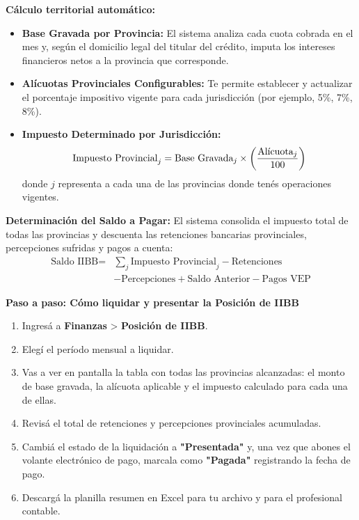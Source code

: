 \documentclass[12pt,a4paper]{article}
\renewcommand{\_}{\textunderscore\allowbreak}
\begin{document}
\textbf{Cálculo territorial automático:}
\begin{itemize}
    \item \textbf{Base Gravada por Provincia:} El sistema analiza cada cuota cobrada en el mes y, según el domicilio legal del titular del crédito, imputa los intereses financieros netos a la provincia que corresponde.
    \item \textbf{Alícuotas Provinciales Configurables:} Te permite establecer y actualizar el porcentaje impositivo vigente para cada jurisdicción (por ejemplo, 5\%, 7\%, 8\%).
    \item \textbf{Impuesto Determinado por Jurisdicción:}
          \begin{equation}
              \text{Impuesto Provincial}_{j} = \text{Base Gravada}_{j} \times \left(\frac{\text{Al\'{\i}cuota}_{j}}{100}\right)
          \end{equation}
          donde $j$ representa a cada una de las provincias donde tenés operaciones vigentes.
\end{itemize}

\textbf{Determinación del Saldo a Pagar:}
El sistema consolida el impuesto total de todas las provincias y descuenta las retenciones bancarias provinciales, percepciones sufridas y pagos a cuenta:
\begin{equation}
    \begin{aligned}
        \text{Saldo IIBB} ={} & \sum_{j} \text{Impuesto Provincial}_{j} - \text{Retenciones} \\
        & - \text{Percepciones} + \text{Saldo Anterior} - \text{Pagos VEP}
    \end{aligned}
\end{equation}

\textbf{Paso a paso: Cómo liquidar y presentar la Posición de IIBB}
\begin{enumerate}
    \item Ingresá a \textbf{Finanzas} > \textbf{Posición de IIBB}.
    \item Elegí el período mensual a liquidar.
    \item Vas a ver en pantalla la tabla con todas las provincias alcanzadas: el monto de base gravada, la alícuota aplicable y el impuesto calculado para cada una de ellas.
    \item Revisá el total de retenciones y percepciones provinciales acumuladas.
    \item Cambiá el estado de la liquidación a \textbf{"Presentada"} y, una vez que abones el volante electrónico de pago, marcala como \textbf{"Pagada"} registrando la fecha de pago.
    \item Descargá la planilla resumen en Excel para tu archivo y para el profesional contable.
\end{enumerate}
\end{document}
